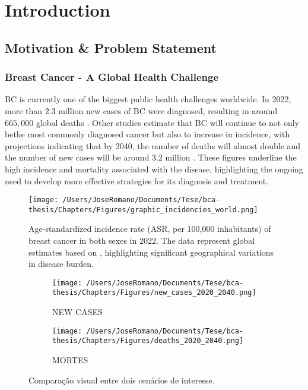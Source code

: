 
%

\chapter{Introduction}
\label{cha:introduction}

\section{Motivation \& Problem Statement}
\label{sec:motivation+problem-statement}
\subsection{Breast Cancer - A Global Health Challenge}

\gls{BC} is currently one of the biggest public health challenges worldwide. In
2022, more than $2.3$ million new cases of \gls{BC} were diagnosed, resulting in
around $665,\!000$ global deaths \textcite{bcaData2024_bray}. Other studies
estimate that \gls{BC} will continue to not only bethe most commonly diagnosed
cancer but also to increase in incidence, with projections indicating that by
2040, the number of deaths will almost double and the number of new cases will
be around $3.2$ million \textcite{bca_data_Arnold2022Current}. These figures
underline the high incidence and mortality associated with the disease,
highlighting the ongoing need to develop more effective strategies for
its diagnosis and treatment.

\begin{figure}[h!]
  \centering
  \texttt{[image: /Users/JoseRomano/Documents/Tese/bca-thesis/Chapters/Figures/graphic\_incidencies\_world.png]}
  \caption{Age-standardized incidence rate (ASR, per 100,000 inhabitants) of breast cancer in both sexes in 2022. The data represent global estimates based on \textcite{GLOBOCAN2022}, highlighting significant geographical variations in disease burden.}
\end{figure}

\begin{figure}[h!]
  \centering
  \begin{subfigure}[b]{0.8\textwidth}
    \centering
    \texttt{[image: /Users/JoseRomano/Documents/Tese/bca-thesis/Chapters/Figures/new\_cases\_2020\_2040.png]}
    \caption{NEW CASES}
    \label{fig:imagem1}
  \end{subfigure}
  \vspace{0.5cm}
  \begin{subfigure}[b]{0.8\textwidth}
    \centering
    \texttt{[image: /Users/JoseRomano/Documents/Tese/bca-thesis/Chapters/Figures/deaths\_2020\_2040.png]}
    \caption{MORTES}
    \label{fig:imagem2}
  \end{subfigure}
  \caption{Comparação visual entre dois cenários de interesse.}
  \label{fig:duas-imagens-empilhadas}
\end{figure}

